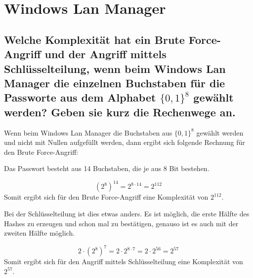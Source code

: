 \section{Windows Lan Manager}
\subsection{Welche Komplexität hat ein Brute Force-Angriff und der Angriff mittels Schlüsselteilung, wenn beim Windows Lan Manager die einzelnen Buchstaben für die Passworte aus dem Alphabet $\{0, 1\}^8$ gewählt werden? Geben sie kurz die Rechenwege an.}

Wenn beim Windows Lan Manager die Buchstaben aus $\{0, 1\}^8$ gewählt werden und nicht mit Nullen aufgefüllt werden, dann ergibt sich folgende Rechnung für den Brute Force-Angriff:

Das Passwort besteht aus 14 Buchstaben, die je aus 8 Bit bestehen.

$$ 
(2^8)^{14} = 2^{8 \cdot 14} =2^{112} 
$$
Somit ergibt sich für den Brute Force-Angriff eine Komplexität von $2^{112}$.

Bei der Schlüsselteilung ist dies etwas anders. Es ist möglich, die erste Hälfte des Hashes zu erzeugen und schon mal zu bestätigen, genauso ist es auch mit der zweiten Hälfte möglich. 

$$
2 \cdot (2^8)^7 = 2 \cdot 2^{8 \cdot 7} = 2 \cdot 2^{56} = 2^{57}
$$
Somit ergibt sich für den Angriff mittels Schlüsselteilung eine Komplexität von $2^{57}$.